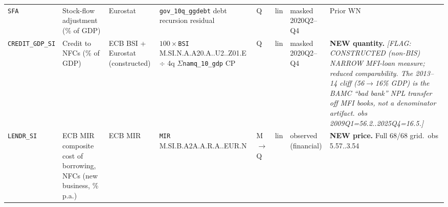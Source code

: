 {\begin{longtable}{@{}p{1.9cm}p{2.9cm}p{1.5cm}p{2.7cm}p{0.7cm}p{1.0cm}p{1.6cm}p{2.4cm}@{}}
\texttt{SFA}          & Stock-flow adjustment (\% of GDP) & Eurostat & \texttt{gov\_10q\_ggdebt} debt recursion residual      & Q & lin & masked 2020Q2--Q4 & Prior WN \\
\texttt{CREDIT\_GDP\_SI} & Credit to NFCs (\% of GDP)     & ECB BSI + Eurostat (constructed) & $100\times$\texttt{BSI} M.\allowbreak SI.\allowbreak N.\allowbreak A.\allowbreak A20.\allowbreak A.\allowbreak 1.\allowbreak U2.\allowbreak 2240.\allowbreak Z01.\allowbreak E $\div$ 4q $\Sigma$\texttt{namq\_10\_gdp} CP & Q & lin & masked 2020Q2--Q4 & \textbf{NEW quantity.} \textit{[FLAG: CONSTRUCTED (non-BIS) NARROW MFI-loan measure; reduced comparability. The 2013--14 cliff (56\(\to\)16\% GDP) is the BAMC ``bad bank'' NPL transfer off MFI books, not a denominator artifact. obs 2009Q1=56.2..2025Q4=16.5.]} \\
\texttt{LENDR\_SI}    & ECB MIR composite cost of borrowing, NFCs (new business, \% p.a.) & ECB MIR & \texttt{MIR} M.\allowbreak SI.\allowbreak B.\allowbreak A2A.\allowbreak A.\allowbreak R.\allowbreak A.\allowbreak 2240.\allowbreak EUR.\allowbreak N & M$\to$Q & lin & observed (financial) & \textbf{NEW price.} Full 68/68 grid.\ obs 5.57..3.54 \\
\end{longtable}}

